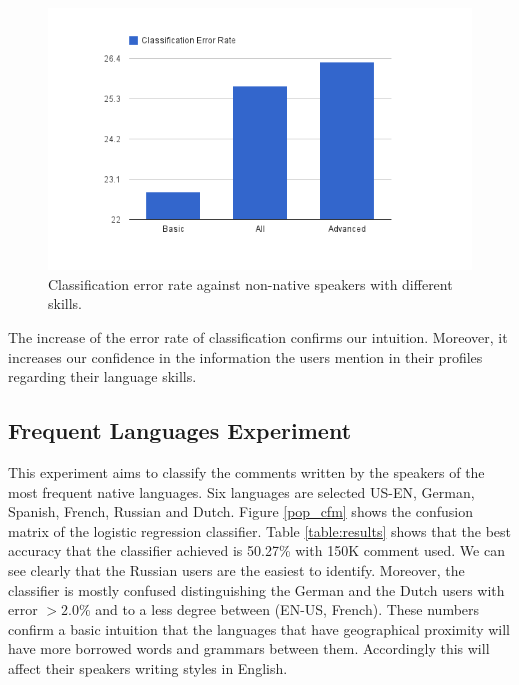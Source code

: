 \documentclass[10pt,a5paper,twoside]{article}
\begin{document}
\begin{figure}
\centering
\includegraphics[scale=0.50]{fluency.png}
\caption{Classification error rate against non-native speakers with different
skills.}
\label{fluency}
\end{figure}

The increase of the error rate of classification confirms our intuition.
Moreover, it increases our confidence in the information the users mention in
their profiles regarding their language skills.

\subsection{Frequent Languages Experiment}
\label{frequent}
This experiment aims to classify the comments written by the speakers of the most frequent native languages.
Six languages are selected US-EN, German, Spanish, French, Russian and Dutch.
Figure \ref{pop_cfm} shows the confusion matrix of the logistic regression
classifier.
Table \ref{table:results} shows that the best accuracy that the classifier
achieved is 50.27\% with 150K comment used. We can see clearly that the
Russian users are the easiest to identify. Moreover, the classifier is mostly
confused distinguishing the German and the Dutch users with error $>2.0\%$ and
to a less degree between (EN-US, French). These numbers confirm a basic
intuition that the languages that have geographical proximity will have more
borrowed words and grammars between them. Accordingly this will affect their speakers writing styles in English.
\end{document}
